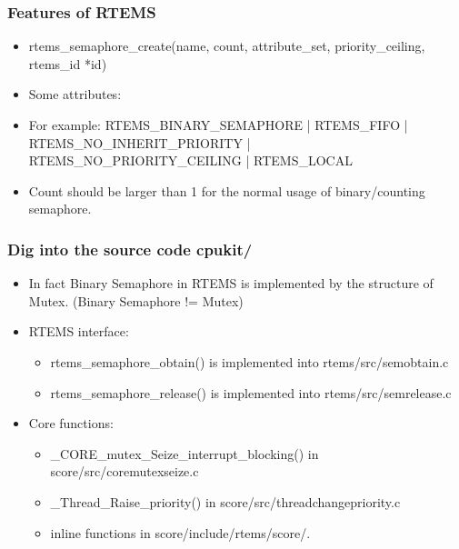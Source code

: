 \documentclass[t]{beamer}
\begin{document}
\begin{frame}
\frametitle{Features of RTEMS}
\begin{itemize}
\item rtems\_semaphore\_create(name, count, attribute\_set, priority\_ceiling, rtems\_id *id)
\item Some attributes:
\item For example:{ \scriptsize{RTEMS\_BINARY\_SEMAPHORE | RTEMS\_FIFO | RTEMS\_NO\_INHERIT\_PRIORITY | RTEMS\_NO\_PRIORITY\_CEILING | RTEMS\_LOCAL}}
\item Count should be larger than 1 for the normal usage of binary/counting semaphore. 
\end{itemize}
\end{frame}

\begin{frame}
\frametitle{Dig into the source code cpukit/}
\begin{itemize}
\item In fact Binary Semaphore in RTEMS is implemented by the structure of Mutex. (Binary Semaphore != Mutex)
\item RTEMS interface:
\begin{itemize}
\item rtems\_semaphore\_obtain() is implemented into rtems/src/semobtain.c
\item rtems\_semaphore\_release() is implemented into rtems/src/semrelease.c
\end{itemize}
\item Core functions:
\begin{itemize}
\item \_CORE\_mutex\_Seize\_interrupt\_blocking() in score/src/coremutexseize.c
\item \_Thread\_Raise\_priority() in score/src/threadchangepriority.c
\item inline functions in score/include/rtems/score/.
\end{itemize}

\end{itemize}
\end{frame}
\end{document}
